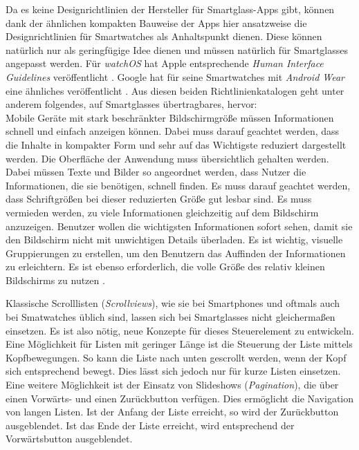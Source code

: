 Da es keine Designrichtlinien der Hersteller für Smartglass-Apps gibt, können dank der ähnlichen kompakten Bauweise der Apps hier ansatzweise die Designrichtlinien für Smartwatches als Anhaltspunkt dienen. Diese können natürlich nur als geringfügige Idee dienen und müssen natürlich für Smartglasses angepasst werden.
Für \emph{watchOS} hat Apple entsprechende \emph{Human Interface Guidelines} veröffentlicht \cite{Apple2018c}. Google hat für seine Smartwatches mit \emph{Android Wear} eine ähnliches veröffentlicht \cite{Google2018}. Aus diesen beiden Richtlinienkatalogen geht unter anderem folgendes, auf Smartglasses übertragbares, hervor:
\\
Mobile Geräte mit stark beschränkter Bildschirmgröße  müssen Informationen schnell und einfach anzeigen können. Dabei muss darauf geachtet werden, dass die Inhalte in kompakter Form und sehr auf das Wichtigste reduziert dargestellt werden. Die Oberfläche der Anwendung muss übersichtlich gehalten werden. Dabei müssen Texte und Bilder so angeordnet werden, dass Nutzer die Informationen, die sie benötigen, schnell finden. Es muss darauf geachtet werden, dass Schriftgrößen bei dieser reduzierten Größe gut lesbar sind. Es muss vermieden werden, zu viele Informationen gleichzeitig auf dem Bildschirm anzuzeigen. Benutzer wollen die wichtigsten Informationen sofort sehen, damit sie den Bildschirm nicht mit unwichtigen Details überladen. Es ist wichtig, visuelle Gruppierungen zu erstellen, um den Benutzern das Auffinden der Informationen zu erleichtern. Es ist ebenso erforderlich, die volle Größe des relativ kleinen Bildschirms zu nutzen \cite{Apple2018c, Google2018}.

Klassische Scrolllisten (\emph{Scrollviews}), wie sie bei Smartphones und oftmals auch bei Smatwatches üblich sind, lassen sich bei Smartglasses nicht gleichermaßen einsetzen. Es ist also nötig, neue Konzepte für dieses Steuerelement zu entwickeln. Eine Möglichkeit für Listen mit geringer Länge ist die Steuerung der Liste mittels Kopfbewegungen. So kann die Liste nach unten gescrollt werden, wenn der Kopf sich entsprechend bewegt. Dies lässt sich jedoch nur für kurze Listen einsetzen. Eine weitere Möglichkeit ist der Einsatz von Slideshows (\emph{Pagination}), die über einen Vorwärts- und einen Zurückbutton verfügen. Dies ermöglicht die Navigation von langen Listen. Ist der Anfang der Liste erreicht, so wird der Zurückbutton ausgeblendet. Ist das Ende der Liste erreicht, wird entsprechend der Vorwärtsbutton ausgeblendet.
%
%
%
%
%
%
